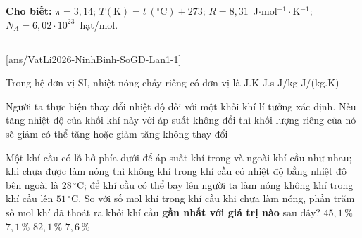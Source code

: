 \def\CheDo{solcolor}%
\def\tenchuong{Sở GD\&ĐT Ninh Bình -- Lần 1}
\def\thuonghieu{VẬT LÍ 12 -- Eduzy.com.vn}
\def\TachCauDS{1}
\def\TachCauLG{1}




	\noindent\textbf{Cho biết:} $\pi=3{,}14$; $T(\text{K})=t\,(^\circ\text{C})+273$; $R=8{,}31$~J$\cdot$mol$^{-1}\cdot$K$^{-1}$; $N_A=6{,}02\cdot 10^{23}$~hạt/mol.

	\noindent
	\subsection*{}
	\setcounter{ex}{0}
	[ans/VatLi2026-NinhBinh-SoGD-Lan1-1]

	\begin{ex}%
		Trong hệ đơn vị SI, nhiệt nóng chảy riêng có đơn vị là
		\choice
		{J.K}
		{J.s}
		{\True J/kg}
		{J/(kg.K)}
	\end{ex}

	\begin{ex}%
		Người ta thực hiện thay đổi nhiệt độ đối với một khối khí lí tưởng xác định. Nếu tăng nhiệt độ của khối khí này với áp suất không đổi thì khối lượng riêng của nó sẽ
		\choice
		{\True giảm}
		{có thể tăng hoặc giảm}
		{tăng}
		{không thay đổi}
	\end{ex}

	\begin{ex}%
		Một khí cầu có lỗ hở phía dưới để áp suất khí trong và ngoài khí cầu như nhau; khi chưa được làm nóng thì không khí trong khí cầu có nhiệt độ bằng nhiệt độ bên ngoài là $28\,^\circ\text{C}$; để khí cầu có thể bay lên người ta làm nóng không khí trong khí cầu lên $51\,^\circ\text{C}$. So với số mol khí trong khí cầu khi chưa làm nóng, phần trăm số mol khí đã thoát ra khỏi khí cầu \textbf{gần nhất với giá trị nào} sau đây?
		\choice
		{$45{,}1\,\%$}
		{\True $7{,}1\,\%$}
		{$82{,}1\,\%$}
		{$7{,}6\,\%$}
	\end{ex}

